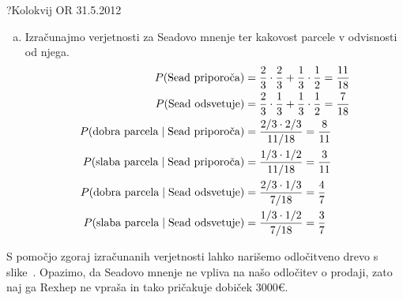 \begin{naloga}{?}{Kolokvij OR 31.5.2012}
\begin{odgovor}
\begin{enumerate}[(a)]
\item Izračunajmo verjetnosti za Seadovo mnenje
ter kakovost parcele v odvisnosti od njega.
\begin{align*}
P(\text{Sead priporoča}) &=
{2 \over 3} \cdot {2 \over 3} + {1 \over 3} \cdot {1 \over 2}
= {11 \over 18} \\
P(\text{Sead odsvetuje}) &=
{2 \over 3} \cdot {1 \over 3} + {1 \over 3} \cdot {1 \over 2}
= {7 \over 18} \\
P(\text{dobra parcela} \;|\; \text{Sead priporoča})
&= {2/3 \cdot 2/3 \over 11/18} = {8 \over 11} \\
P(\text{slaba parcela} \;|\; \text{Sead priporoča})
&= {1/3 \cdot 1/2 \over 11/18} = {3 \over 11} \\
P(\text{dobra parcela} \;|\; \text{Sead odsvetuje})
&= {2/3 \cdot 1/3 \over 7/18} = {4 \over 7} \\
P(\text{slaba parcela} \;|\; \text{Sead odsvetuje})
&= {1/3 \cdot 1/2 \over 7/18} = {3 \over 7}
\end{align*}
\end{enumerate}
S pomočjo zgoraj izračunanih verjetnosti
lahko narišemo odločitveno drevo s slike~\fig{}.
Opazimo, da Seadovo mnenje ne vpliva na našo odločitev o prodaji,
zato naj ga Rexhep ne vpraša in tako pričakuje dobiček $3000 €$.

\begin{slika}
\makebox[\textwidth][c]{
\pgfslika
}
\end{slika}
\end{odgovor}
\end{naloga}
